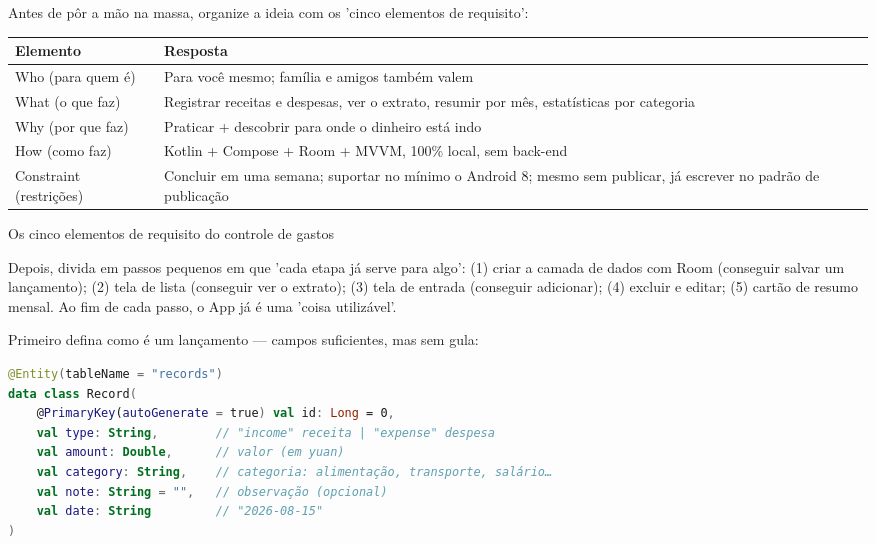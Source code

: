 


Antes de pôr a mão na massa, organize a ideia com os 'cinco elementos de requisito':

\begin{center}
\begin{tabularx}{\linewidth}{|X|X|}
\hline
\textbf{Elemento} & \textbf{Resposta} \tabularnewline
\hline
Who (para quem é) & Para você mesmo; família e amigos também valem \tabularnewline
What (o que faz) & Registrar receitas e despesas, ver o extrato, resumir por mês, estatísticas por categoria \tabularnewline
Why (por que faz) & Praticar + descobrir para onde o dinheiro está indo \tabularnewline
How (como faz) & Kotlin + Compose + Room + MVVM, 100\% local, sem back-end \tabularnewline
Constraint (restrições) & Concluir em uma semana; suportar no mínimo o Android 8; mesmo sem publicar, já escrever no padrão de publicação \tabularnewline
\hline
\end{tabularx}
\end{center}

\begin{center}\small\color{gray}Os cinco elementos de requisito do controle de gastos\end{center}

Depois, divida em passos pequenos em que 'cada etapa já serve para algo': (1) criar a camada de dados com Room (conseguir salvar um lançamento); (2) tela de lista (conseguir ver o extrato); (3) tela de entrada (conseguir adicionar); (4) excluir e editar; (5) cartão de resumo mensal. Ao fim de cada passo, o App já é uma 'coisa utilizável'.


Primeiro defina como é um lançamento — campos suficientes, mas sem gula:

\begin{lstlisting}[language=Kotlin]
@Entity(tableName = "records")
data class Record(
    @PrimaryKey(autoGenerate = true) val id: Long = 0,
    val type: String,        // "income" receita | "expense" despesa
    val amount: Double,      // valor (em yuan)
    val category: String,    // categoria: alimentação, transporte, salário…
    val note: String = "",   // observação (opcional)
    val date: String         // "2026-08-15"
)
\end{lstlisting}


